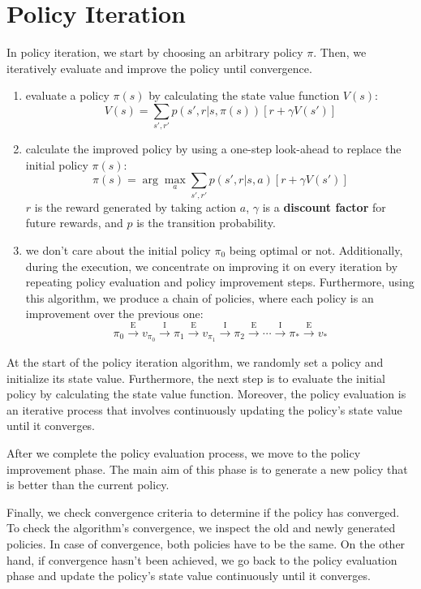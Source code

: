 \section{Policy Iteration \cite{baeldung/cs/ml-value-iteration-vs-policy-iteration}}

In policy iteration, we start by choosing an arbitrary policy $\pi$. Then, we iteratively evaluate and improve the policy until convergence.

\begin{enumerate}
    \item evaluate a policy $\pi(s)$ by calculating the state value function $V(s)$:
    \[
        V(s) = \sum_{s',r'}p(s', r|s,\pi(s))[r+\gamma V(s')]
    \]
    \item calculate the improved policy by using a one-step look-ahead to replace the initial policy $\pi(s)$:
    \[
        \pi(s) = \arg\max_{a} \sum_{s',r'} p(s', r|s,a)[r+\gamma V(s')]
    \]
    $r$ is the reward generated by taking action $a$, $\gamma$ is a \textbf{discount factor} for future rewards, and $p$ is the transition probability.
    \item we don’t care about the initial policy $\pi_0$ being optimal or not. Additionally, during the execution, we concentrate on improving it on every iteration by repeating policy evaluation and policy improvement steps. Furthermore, using this algorithm, we produce a chain of policies, where each policy is an improvement over the previous one:
    \[
        \pi_0 \xrightarrow[]{\text{E}} v_{\pi_0} \xrightarrow[]{\text{I}} \pi_1 \xrightarrow[]{\text{E}} v_{\pi_1} \xrightarrow[]{\text{I}} \pi_2 \xrightarrow[]{\text{E}} \dotsi \xrightarrow[]{\text{I}} \pi_* \xrightarrow[]{\text{E}} v_{*}
    \]
\end{enumerate}

At the start of the policy iteration algorithm, we randomly set a policy and initialize its state value. Furthermore, the next step is to evaluate the initial policy by calculating the state value function. Moreover, the policy evaluation is an iterative process that involves continuously updating the policy’s state value until it converges.

After we complete the policy evaluation process, we move to the policy improvement phase. The main aim of this phase is to generate a new policy that is better than the current policy.

Finally, we check convergence criteria to determine if the policy has converged. To check the algorithm’s convergence, we inspect the old and newly generated policies. In case of convergence, both policies have to be the same. On the other hand, if convergence hasn’t been achieved, we go back to the policy evaluation phase and update the policy’s state value continuously until it converges.

